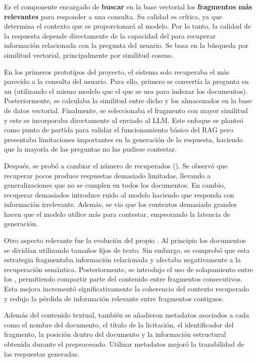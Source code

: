 Es el componente encargado de \textbf{buscar} en la base vectorial los \textbf{fragmentos más relevantes} para responder a una consulta. Su calidad es crítica, ya que determina el contexto que se proporcionará al modelo. Por lo tanto, la calidad de la respuesta depende directamente de la capacidad del  para recuperar información relacionada con la pregunta del usuario. Se basa en la búsqueda por similitud vectorial, principalmente por similitud coseno. 

En los primeros prototipos del proyecto, el sistema solo recuperaba el  más parecido a la consulta del usuario. Para ello, primero se convertía la pregunta en un  (utilizando el mismo modelo que el que se usa para indexar los documentos). Posteriormente, se calculaba la similitud entre dicho  y los almacenados en la base de datos vectorial. Finalmente, se seleccionaba el fragmento con mayor similitud y este se incorporaba directamente al  enviado al LLM. Este enfoque se planteó como punto de partida para validar el funcionamiento básico del RAG pero presentaba limitaciones importantes en la generación de la respuesta, haciendo que la mayoría de las preguntas no las pudiese contestar.

Después, se probó a cambiar el número de  recuperados (). Se observó que recuperar pocos  produce respuestas demasiado limitadas, llevando a generalizaciones que no se cumplen en todos los documentos. En cambio, recuperar demasiados introduce ruido al modelo haciendo que responda con información irrelevante. Además, se vio que los contextos demasiado grandes hacen que el modelo utilice más  para contestar, empeorando la latencia de generación.

Otro aspecto relevante fue la evolución del propio . Al principio los documentos se dividían utilizando tamaños fijos de texto. Sin embargo, se comprobó que esta estrategia fragmentaba información relacionada y afectaba negativamente a la recuperación semántica. Posteriormente, se introdujo el uso de solapamiento entre los , permitiendo compartir parte del contenido entre fragmentos consecutivos. Esta mejora incrementó significativamente la coherencia del contexto recuperado y redujo la pérdida de información relevante entre fragmentos contiguos.

Además del contenido textual, también se añadieron metadatos asociados a cada  como el nombre del documento, el título de la licitación, el identificador del fragmento, la posición dentro del documento y la información estructural obtenida durante el preprocesado. Utilizar metadatos mejoró la trazabilidad de las respuestas generadas.

